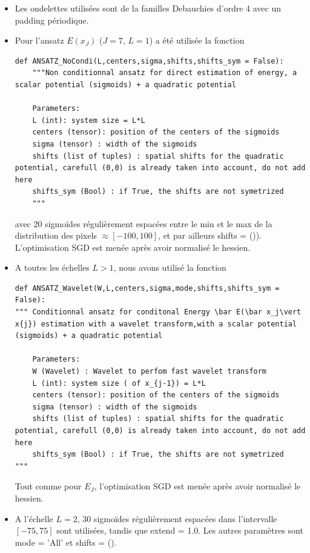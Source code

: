 \documentclass[12pt,twoside]{article}
\newcommand{\itemb}{\item[$\bullet$]}
\begin{document}
\begin{itemize}
\itemb Les ondelettes utilisées sont de la familles Debauchies d'ordre 4 avec un padding périodique.
\itemb Pour l'ansatz $E(x_J)$ ($J=7$, $L=1$) a été utilisée la fonction 
\begin{lstlisting}[language=iPython]
def ANSATZ_NoCondi(L,centers,sigma,shifts,shifts_sym = False):
    """Non conditionnal ansatz for direct estimation of energy, a scalar potential (sigmoids) + a quadratic potential
    
    Parameters:
    L (int): system size = L*L 
    centers (tensor): position of the centers of the sigmoids 
    sigma (tensor) : width of the sigmoids
    shifts (list of tuples) : spatial shifts for the quadratic potential, carefull (0,0) is already taken into account, do not add here  
    shifts_sym (Bool) : if True, the shifts are not symetrized
    """
\end{lstlisting}
avec 20 sigmoïdes  régulièrement espacées entre le min et le max de la distribution des pixels $\approx [-100,100]$, et par ailleurs \textsf{shifts = ()}). L'optimisation SGD est menée après avoir normalisé le hessien.

\itemb A toutes les échelles $L>1$, nous avons utilisé la fonction 
\begin{lstlisting}[language=iPython]
def ANSATZ_Wavelet(W,L,centers,sigma,mode,shifts,shifts_sym = False):
""" Conditionnal ansatz for conditonal Energy \bar E(\bar x_j\vert x{j}) estimation with a wavelet transform,with a scalar potential (sigmoids) + a quadratic potential
    
    Parameters:
    W (Wavelet) : Wavelet to perfom fast wavelet transform
    L (int): system size ( of x_{j-1}) = L*L 
    centers (tensor): position of the centers of the sigmoids 
    sigma (tensor) : width of the sigmoids
    shifts (list of tuples) : spatial shifts for the quadratic potential, carefull (0,0) is already taken into account, do not add here 
    shifts_sym (Bool) : if True, the shifts are not symetrized
"""    
\end{lstlisting}
Tout comme pour $E_J$, l'optimisation SGD est menée après avoir normalisé le hessien.
%
\itemb A l'échelle $L=2$, 30 sigmoïdes régulièrement espacées dans l'intervalle $[-75, 75]$ sont utilisées, tandis que \textsf{extend = 1.0}. Les autres paramètres sont \textsf{mode = 'All'} et \textsf{shifts = ()}.  


\end{itemize}
\end{document}
